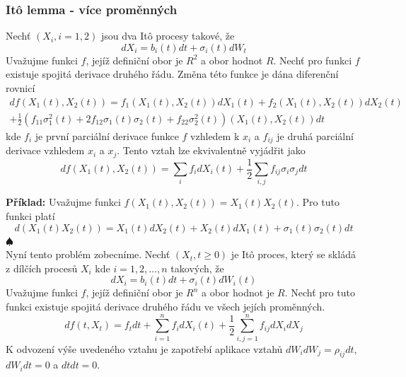 \documentclass[a4paper]{book}
\begin{document}
\subsubsection{It\^o lemma - více proměnných}

Nechť $(X_i, i = 1,2)$ jsou dva It\^o procesy takové, že
\begin{equation*}
d X_i = b_i(t) dt + \sigma_i(t)dW_t
\end{equation*}
Uvažujme funkci $f$, jejíž definiční obor je $R^2$ a obor hodnot $R$. Nechť pro funkci $f$ existuje spojitá derivace druhého řádu. Změna této funkce je dána diferenční rovnicí
\begin{equation*}
\begin{split}
df(X_1(t), X_2(t)) = f_1(X_1(t), X_2(t))dX_1(t) + f_2(X_1(t), X_2(t))d X_2(t)\\ + \frac{1}{2}(f_{11}\sigma_1^2(t) + 2 f_{12}\sigma_1(t)\sigma_2(t) + f_{22}\sigma_2^2(t))(X_1(t), X_2(t))dt
\end{split}
\end{equation*}
kde $f_i$ je první parciální derivace funkce $f$ vzhledem k $x_i$ a $f_{ij}$ je druhá parciální derivace vzhledem $x_i$ a $x_j$. Tento vztah lze ekvivalentně vyjádřit jako
\begin{equation*}
d f(X_1(t), X_2(t)) = \sum_i f_i dX_i(t) + \frac{1}{2}\sum_{i,j}f_{ij} \sigma_i \sigma_j dt
\end{equation*}

\noindent \textbf{Příklad:} Uvažujme funkci $f(X_1(t), X_2(t)) = X_1(t)X_2(t)$. Pro tuto funkci platí
\begin{equation*}
d(X_1(t)X_2(t)) = X_1(t)dX_2(t) + X_2(t)dX_1(t) + \sigma_1(t) \sigma_2(t) dt
\end{equation*}
$\spadesuit$\\

Nyní tento problém zobecníme. Nechť $(X_t, t \ge 0)$ je It\^o proces, který se skládá z dílčích procesů $X_i$ kde $i = 1,2, \dots, n$ takových, že
\begin{equation*}
d X_i = b_i(t)dt + \sigma_i(t)d W_i(t)
\end{equation*}
Uvažujme funkci $f$, jejíž definiční obor je $R^n$ a obor hodnot je $R$. Nechť pro tuto funkci existuje spojitá derivace druhého řádu ve všech jejích proměnných.
\begin{equation*}
d f(t, X_t) = f_t dt + \sum_{i=1}^n f_i d X_i (t) + \frac{1}{2}\sum_{i,j = 1}^n f_{ij}d X_i d X_j
\end{equation*}
K odvození výše uvedeného vztahu je zapotřebí aplikace vztahů $dW_i d W_j = \rho_{ij}dt$, $dW_i dt = 0$ a $dt dt = 0$.\\
\end{document}
